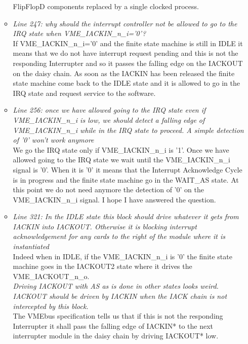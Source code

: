 \documentclass[a4paper,11pt]{article}
\begin{document}
\begin{itemize}
\begin{itemize}
FlipFlopD components replaced by a single clocked process.
\item \textit{Line 247: why should the interrupt controller not be allowed to 
go to the IRQ state when VME\_IACKIN\_n\_i='0'?}\\
If VME\_IACKIN\_n\_i='0' and the finite state machine is still in IDLE it means 
that we do not have interrupt request pending and this is not the responding 
Interrupter and so it passes the falling edge on the IACKOUT on the daisy chain.
As soon as the IACKIN has been released the finite state machine come back to the
IDLE state and it is allowed to go in the IRQ state and request service to the 
software.

\item \textit{Line 256: once we have allowed going to the IRQ state even if
VME\_IACKIN\_n\_i is low, we should detect a falling edge of
VME\_IACKIN\_n\_i while in the IRQ state to proceed. A simple detection
of '0' won't work anymore}\\

We go the IRQ state only if VME\_IACKIN\_n\_i is '1'. Once we have allowed
going to the IRQ state we wait until the VME\_IACKIN\_n\_i signal is '0'.
When it is '0' it means that the Interrupt Acknowledge Cycle is in progress and 
the finite state machine go in the WAIT\_AS state. At this point we do not need 
anymore the detection of '0' on the VME\_IACKIN\_n\_i signal.
I hope I have answered the question.

\item \textit{Line 321: In the IDLE state this block should drive whatever it 
gets from IACKIN into IACKOUT. Otherwise it is blocking interrupt
acknowledgement for any cards to the right of the module where it is
instantiated}\\

Indeed when in IDLE, if the VME\_IACKIN\_n\_i is '0' the finite state machine 
goes in the IACKOUT2 state where it drives the VME\_IACKOUT\_n\_o.\\

\textit{Driving IACKOUT with AS as is done in other
states looks weird. IACKOUT should be driven by IACKIN when the IACK
chain is not intercepted by this block.}\\

The VMEbus specification tells us that if this is not the responding Interrupter
it shall pass the falling edge of IACKIN* to the next interrupter module in the daisy chain by driving IACKOUT* low.\\


\end{itemize}
\end{itemize}
\end{document}
